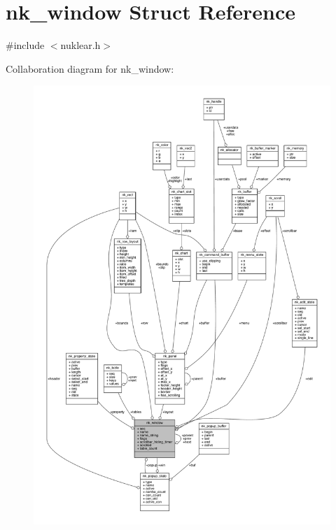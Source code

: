 \hypertarget{structnk__window}{}\section{nk\+\_\+window Struct Reference}
\label{structnk__window}


{\ttfamily \#include $<$nuklear.\+h$>$}



Collaboration diagram for nk\+\_\+window\+:
\nopagebreak
\begin{figure}[H]
\begin{center}
\leavevmode
\includegraphics[width=350pt]{structnk__window__coll__graph}
\end{center}
\end{figure}
